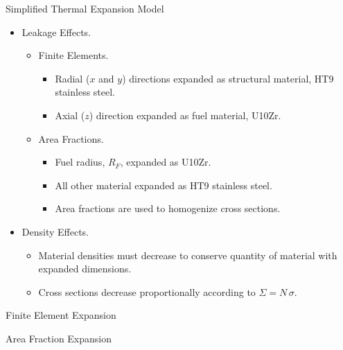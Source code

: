 \begin{frame}{Simplified Thermal Expansion Model}
  \begin{itemize}
    \item Leakage Effects.
      \begin{itemize}
        \item Finite Elements.
          \begin{itemize}
            \item Radial ($x$ and $y$) directions expanded as structural
              material, HT9 stainless steel.
            \item Axial ($z$) direction expanded as fuel material, U10Zr.
          \end{itemize}
        \item Area Fractions.
          \begin{itemize}
            \item Fuel radius, $R_F$, expanded as U10Zr.
            \item All other material expanded as HT9 stainless steel.
            \item Area fractions are used to homogenize cross sections.
          \end{itemize}
      \end{itemize}
    \item Density Effects.
      \begin{itemize}
        \item Material densities must decrease to conserve quantity of material
          with expanded dimensions.
        \item Cross sections decrease proportionally according to $\Sigma = N \,
          \sigma$.
      \end{itemize}
  \end{itemize}
\end{frame}

\begin{frame}{Finite Element Expansion}
\end{frame}

\begin{frame}{Area Fraction Expansion}
  \begin{figure}
    \centering
    \hspace{0.2in}
    \label{fig:assy_geometry}
  \end{figure}
\end{frame}

